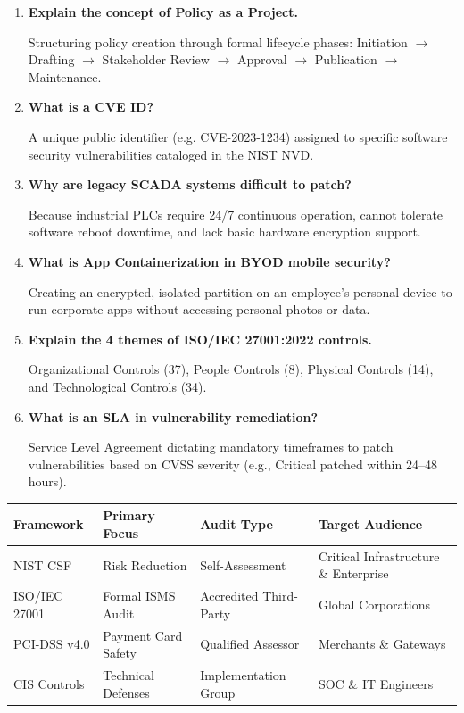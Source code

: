\documentclass[12pt,a4paper]{article}
\newcommand{\Q}[1]{\textbf{#1}\par\noindent\ignorespaces}
\renewcommand{\arraystretch}{1.45}
\begin{document}
\begin{tcolorbox}[exambox, title={\textbf{Frequently Asked / Viva Questions}}]
\begin{enumerate}[leftmargin=*, label=\textbf{Q\arabic*.}, itemsep=5pt, topsep=0pt]
  \item \Q{Explain the concept of Policy as a Project.}
        Structuring policy creation through formal lifecycle phases: Initiation $\to$ Drafting $\to$ Stakeholder Review $\to$ Approval $\to$ Publication $\to$ Maintenance.

  \item \Q{What is a CVE ID?}
        A unique public identifier (e.g. CVE-2023-1234) assigned to specific software security vulnerabilities cataloged in the NIST NVD.

  \item \Q{Why are legacy SCADA systems difficult to patch?}
        Because industrial PLCs require 24/7 continuous operation, cannot tolerate software reboot downtime, and lack basic hardware encryption support.

  \item \Q{What is App Containerization in BYOD mobile security?}
        Creating an encrypted, isolated partition on an employee's personal device to run corporate apps without accessing personal photos or data.

  \item \Q{Explain the 4 themes of ISO/IEC 27001:2022 controls.}
        Organizational Controls (37), People Controls (8), Physical Controls (14), and Technological Controls (34).

  \item \Q{What is an SLA in vulnerability remediation?}
        Service Level Agreement dictating mandatory timeframes to patch vulnerabilities based on CVSS severity (e.g., Critical patched within 24--48 hours).
\end{enumerate}
\end{tcolorbox}

\begin{tcolorbox}[tikzbox, title={Summary Comparison: Industry Security Frameworks}]
\centering
{\renewcommand{\arraystretch}{1.45}%
\begin{tabularx}{\linewidth}{|B{2.8cm}|Y|Y|Y|}
\hline
\textbf{Framework} & \textbf{Primary Focus} & \textbf{Audit Type} & \textbf{Target Audience} \\
\hline
NIST CSF & Risk Reduction & Self-Assessment & Critical Infrastructure \& Enterprise \\
\hline
ISO/IEC 27001 & Formal ISMS Audit & Accredited Third-Party & Global Corporations \\
\hline
PCI-DSS v4.0 & Payment Card Safety & Qualified Assessor & Merchants \& Gateways \\
\hline
CIS Controls & Technical Defenses & Implementation Group & SOC \& IT Engineers \\
\hline
\end{tabularx}}
\end{tcolorbox}
\end{document}
